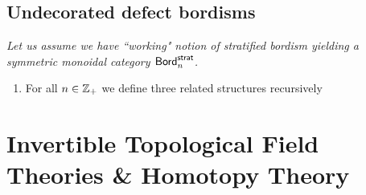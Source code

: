 \subsection{Undecorated defect bordisms}
\textit{Let us assume we have ``working" notion of stratified bordism yielding a symmetric monoidal category ${\sf Bord}^{{\sf strat}}_n$.}
\begin{enumerate}
    \item For all $n\in \mathbb Z_+$ we define three related structures recursively
\end{enumerate}

\section{Invertible Topological Field Theories \& Homotopy Theory}

